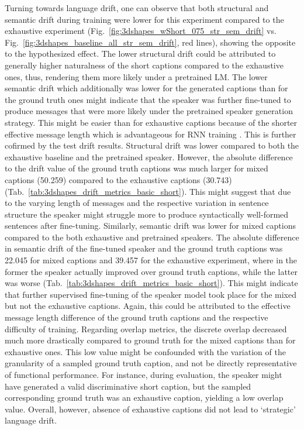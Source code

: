 Turning towards language drift, one can observe that both structural and semantic drift during training were lower for this experiment compared to the exhaustive experiment (Fig.~\ref{fig:3dshapes_wShort_075_str_sem_drift} vs. Fig.~\ref{fig:3dshapes_baseline_all_str_sem_drift}, red lines), showing the opposite to the hypothesized effect. The lower structural drift could be attributed to generally higher naturalness of the short captions compared to the exhaustive ones, thus, rendering them more likely under a pretrained LM. The lower semantic drift which additionally was lower for the generated captions than for the ground truth ones might indicate that the speaker was further fine-tuned to produce messages that were more likely under the pretrained speaker generation strategy. This might be easier than for exhaustive captions because of the shorter effective message length which is advantageous for RNN training \parencite[cf.][]{jaeger2002tutorial}. This is further cofirmed by the test drift results. Structural drift was lower compared to both the exhaustive baseline and the pretrained speaker. However, the absolute difference to the drift value of the ground truth captions was much larger for mixed captions (50.259) compared to the exhaustive captions (30.743) (Tab.~\ref{tab:3dshapes_drift_metrics_basic_short}). This might suggest that due to the varying length of messages and the respective variation in sentence structure the speaker might struggle more to produce syntactically well-formed sentences after fine-tuning. 
Similarly, semantic drift was lower for mixed captions compared to the both exhaustive and pretrained speakers. The absolute difference in semantic drift of the fine-tuned speaker and the ground truth captions was 22.045 for mixed captions and 39.457 for the exhaustive experiment, where in the former the speaker actually improved over ground truth captions, while the latter was worse (Tab.~\ref{tab:3dshapes_drift_metrics_basic_short}). This might indicate that further supervised fine-tuning of the speaker model took place for the mixed but not the exhaustive captions. Again, this could be attributed to the effective message length difference of the ground truth captions and the respective difficulty of training.
Regarding overlap metrics, the discrete overlap decreased much more drastically compared to ground truth for the mixed captions than for exhaustive ones. This low value might be confounded with the variation of the granularity of a sampled ground truth caption, and not be directly representative of functional performance. For instance, during evaluation, the speaker might have generated a valid discriminative short caption, but the sampled corresponding ground truth was an exhaustive caption, yielding a low overlap value. Overall, however, absence of exhaustive captions did not lead to `strategic' language drift.  

